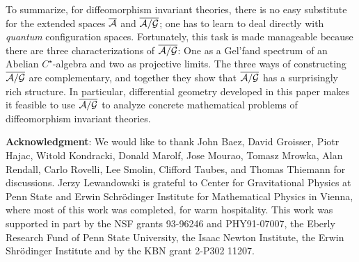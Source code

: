 To summarize, for diffeomorphism invariant theories, there is no easy
substitute for the extended spaces ${\overline {{\cal A}}}$ and $\overline{{\cal A}/{\cal G}}$; one has to learn
to deal directly with {\it quantum} configuration spaces. Fortunately,
this task is made manageable because there are three characterizations
of $\overline{{\cal A}/{\cal G}}$: One as a Gel'fand spectrum of an Abelian $C^\star$-algebra
and two as projective limits. The three ways of constructing $\overline{{\cal A}/{\cal G}}$
are complementary, and together they show that $\overline{{\cal A}/{\cal G}}$ has a
surprisingly rich structure. In particular, differential geometry
developed in this paper makes it feasible to use $\overline{{\cal A}/{\cal G}}$ to analyze
concrete mathematical problems of diffeomorphism invariant theories.


\bigskip\goodbreak
{\bf Acknowledgment}: We would like to thank John Baez, David
Groisser, Piotr Hajac, Witold Kondracki, Donald Marolf, Jose Mourao,
Tomasz Mrowka, Alan Rendall, Carlo Rovelli, Lee Smolin, Clifford
Taubes, and Thomas Thiemann for discussions.  Jerzy Lewandowski is
grateful to Center for Gravitational Physics at Penn State and Erwin
Schr\"odinger Institute for Mathematical Physics in Vienna, where most
of this work was completed, for warm hospitality.  This work was
supported in part by the NSF grants 93-96246 and PHY91-07007, the
Eberly Research Fund of Penn State University, the Isaac Newton
Institute, the Erwin Shr\"odinger Institute and by the KBN grant
2-P302 11207.

\bigskip
\goodbreak  

